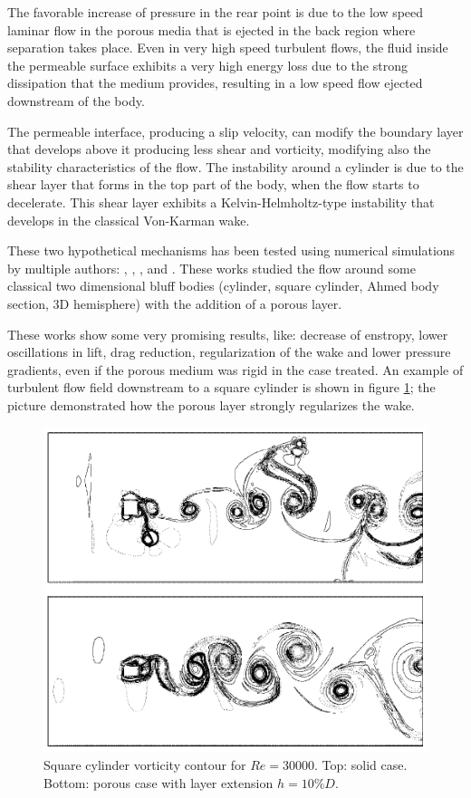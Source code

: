 The favorable increase of pressure in the rear point is due to the low speed laminar flow in the porous media that is ejected in the back region where separation takes place.
Even in very high speed turbulent flows, the fluid inside the permeable surface exhibits a very high energy loss due to the strong dissipation that the medium provides, resulting in a low speed flow ejected downstream of the body.

The permeable interface, producing a slip velocity, can modify the boundary layer that develops above it producing less shear and vorticity, modifying also the stability characteristics of the flow.
The instability around a cylinder is due to the shear layer that forms in the top part of the body, when the flow starts to decelerate.
This shear layer exhibits a Kelvin-Helmholtz-type instability that develops in the classical Von-Karman wake.

These two hypothetical mechanisms has been tested using numerical simulations by multiple authors: \citet{bruneau2004passive}, \citet{bhattacharyya2011reduction}, \citet{naito2012numerical}, \citet{bruneau2008numerical} and \citet{mimeau2017passive}.
These works studied the flow around some classical two dimensional bluff bodies (cylinder, square cylinder, Ahmed body section, 3D hemisphere) with the addition of a porous layer.

These works show some very promising results, like: decrease of enstropy, lower oscillations in lift, drag reduction, regularization of the wake and lower pressure gradients, even if the porous medium was rigid in the case treated.
An example of turbulent flow field downstream to a square cylinder is shown in figure \ref{fig:porous_cylinder}; the picture demonstrated how the porous layer strongly regularizes the wake.

\begin{figure}[h]
	\centering
	\includegraphics[width=0.7\linewidth]{chapter_1/cylinder_porous}
	\caption{Square cylinder vorticity contour for $Re=30000$. Top: solid case. Bottom: porous case with layer extension $h=10\% D$.}
	\label{fig:porous_cylinder}
\end{figure}


